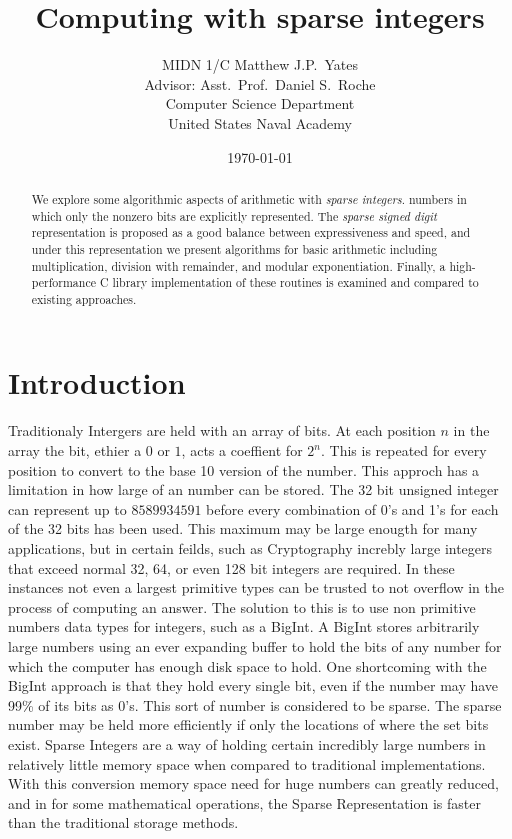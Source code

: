 \documentclass[letterpaper,11pt]{article}
\begin{document}
\title{Computing with sparse integers}

\author{MIDN 1/C Matthew J.P.~Yates\\[2mm]
{\small Advisor: Asst.~Prof.~Daniel S.~Roche}\\
{\small Computer Science Department}\\
{\small United States Naval Academy}
}

\date{\today}

\maketitle

\begin{abstract}
  We explore some
  algorithmic aspects of arithmetic with \emph{sparse integers}. 
  numbers in which only the nonzero bits are explicitly represented. 
  The \emph{sparse signed digit} representation is proposed as a good
  balance between expressiveness and speed, and under this representation
  we present algorithms for basic arithmetic including multiplication,
  division with remainder, and modular exponentiation. Finally, a 
  high-performance
  C library implementation of these routines is examined and compared
  to existing approaches.
\end{abstract}

\section{Introduction} 
Traditionaly Intergers are held with an array of bits. At each position $n$ in the array the bit, ethier a $0$ or $1$, 
acts a coeffient for $2^{n}$. This is repeated for every position to convert to the base 10 version of the number.
This approch has a limitation in how large of an number can be stored. The 32 bit unsigned integer can represent up to $8589934591$
before every combination of 0's and 1's for each of the 32 bits has been used. This maximum may be large enougth for many applications, but 
in certain feilds, such as Cryptography increbly large integers that exceed normal 32, 64, or even 128 bit integers are required.
In these instances not even a largest primitive types can be trusted to not
overflow in the process of computing an answer. The solution to this is
to use non primitive numbers data types for integers, such as a BigInt.
A BigInt stores arbitrarily large numbers using an ever expanding buffer to hold the bits of any
number for which the computer has enough disk space to hold. 
One shortcoming with the BigInt approach is that they hold every single bit, even
if the number may have 99\% of its bits as 0's. This sort of number is
considered to be sparse.  The sparse number may be held more efficiently
if only the locations of where the set bits exist. 
Sparse Integers are a way of holding certain incredibly large numbers in relatively 
little memory space when compared to traditional implementations.
With this conversion memory space need for huge numbers can greatly reduced, and in for some
mathematical operations, the Sparse Representation is faster than the traditional storage methods.
\end{document}
